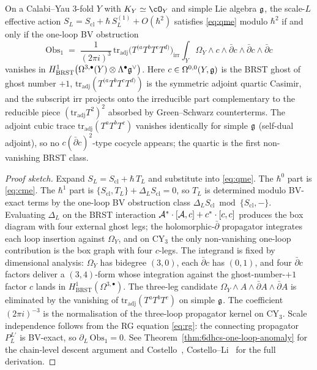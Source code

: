 \begin{proposition}
\label{prop:hcs-one-loop-anomaly}
\ClaimStatusProvedElsewhere
On a Calabi--Yau $3$-fold $Y$ with $K_{Y}\simeq\cO_{Y}$ and simple Lie
algebra $\mathfrak{g}$, the scale-$L$ effective action
$S_{L} = S_{\mathrm{cl}} + \hbar\,S^{(1)}_{L} + O(\hbar^{2})$
satisfies \eqref{eq:qme} modulo $\hbar^{2}$ if and only if the one-loop
BV obstruction
\begin{equation}\label{eq:one-loop-anomaly}
 \mathrm{Obs}_{1}
 \;=\;
 \frac{1}{(2\pi i)^{3}}\,
 \mathrm{tr}_{\mathrm{adj}}\!\bigl(T^{(a}T^{b}T^{c}T^{d)}\bigr)_{\mathrm{irr}}
 \int_{Y}\Omega_{Y}\wedge
 c\wedge\bar\partial c\wedge\bar\partial c\wedge\bar\partial c
\end{equation}
vanishes in $H^{1}_{\mathrm{BRST}}\bigl(\Omega^{3,\bullet}(Y)\otimes
\Lambda^{\bullet}\mathfrak{g}^{\vee}\bigr)$. Here $c\in\Omega^{0,0}(Y,\mathfrak{g})$ is
the BRST ghost of ghost number $+1$,
$\mathrm{tr}_{\mathrm{adj}}(T^{(a}T^{b}T^{c}T^{d)})$ is the symmetric
adjoint quartic Casimir, and the subscript $\mathrm{irr}$ projects onto
the irreducible part complementary to the reducible piece
$(\mathrm{tr}_{\mathrm{adj}}T^{2})^{2}$ absorbed by Green--Schwarz
counterterms. The adjoint cubic trace
$\mathrm{tr}_{\mathrm{adj}}(T^{a}T^{b}T^{c})$ vanishes identically for
simple $\mathfrak{g}$ (self-dual adjoint), so no $c(\bar\partial c)^{2}$-type
cocycle appears; the quartic is the first non-vanishing BRST class.
\end{proposition}

\begin{proof}[Proof sketch]
Expand $S_{L} = S_{\mathrm{cl}} + \hbar\,T_{L}$ and substitute into
\eqref{eq:qme}. The $\hbar^{0}$ part is \eqref{eq:cme}. The $\hbar^{1}$
part is
$\{S_{\mathrm{cl}},T_{L}\} + \Delta_{L}S_{\mathrm{cl}} = 0$,
so $T_{L}$ is determined modulo BV-exact terms by the one-loop BV
obstruction class
$\Delta_{L}S_{\mathrm{cl}}\bmod\{S_{\mathrm{cl}},-\}$.
Evaluating $\Delta_{L}$ on the BRST interaction
$\mathcal{A}^{*}\cdot[\mathcal{A},c] + c^{*}\cdot[c,c]$ produces the box diagram with
four external ghost legs; the holomorphic-$\bar\partial$ propagator
integrates each loop insertion against $\Omega_{Y}$, and on $\mathrm{CY}_{3}$
the only non-vanishing one-loop contribution is the box graph with
four $c$-legs. The integrand is fixed by dimensional analysis:
$\Omega_{Y}$ has bidegree $(3,0)$, each $\bar\partial c$ has $(0,1)$,
and four $\bar\partial c$ factors deliver a $(3,4)$-form whose
integration against the ghost-number-$+1$ factor $c$ lands in
$H^{1}_{\mathrm{BRST}}(\Omega^{3,\bullet})$. The three-leg candidate
$\Omega_{Y}\wedge A\wedge\bar\partial A\wedge\bar\partial A$ is
eliminated by the vanishing of $\mathrm{tr}_{\mathrm{adj}}(T^{a}T^{b}T^{c})$
on simple $\mathfrak{g}$. The coefficient $(2\pi i)^{-3}$ is the normalisation
of the three-loop propagator kernel on $\mathrm{CY}_{3}$. Scale
independence follows from the RG equation \eqref{eq:rg}: the
connecting propagator $P_{L}^{L'}$ is BV-exact, so
$\partial_{L}\,\mathrm{Obs}_{1} = 0$. See Theorem~\ref{thm:6dhcs-one-loop-anomaly}
for the chain-level descent argument and Costello~\cite{Costello2015omega},
Costello--Li~\cite{CostelloLi2020} for the full derivation.
\end{proof}


